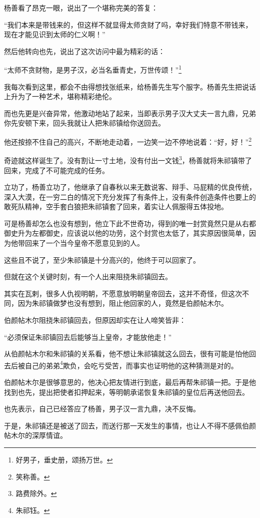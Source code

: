 \begin{multicols}{\theparacolNo}
杨善看了昂克一眼，说出了一个堪称完美的答复：

“我们本来是带钱来的，但这样不就显得太师贪财了吗，幸好我们特意不带钱来，现在才能见识到太师的仁义啊！”

然后他转向也先，说出了这次访问中最为精彩的话：

“太师不贪财物，是男子汉，必当名垂青史，万世传颂！”\footnote{好男子，垂史册，颂扬万世。}

我每次看到这里，都会不由得想找张纸来，给杨善先生写个服字。杨善先生把说话上升为了一种艺术，堪称精彩绝伦。

而也先更是兴奋异常，他激动地站了起来，当即表示男子汉大丈夫一言九鼎，兄弟你先安顿下来，回头我就让人把朱祁镇给你送回去。

他还按捺不住自己的高兴，不断地走动着，一边笑一边不停地说着：“好，好！”\footnote{笑称善。}

奇迹就这样诞生了。没有割让一寸土地，没有付出一文钱\footnote{路费除外。}，杨善就将朱祁镇带了回来，完成了不可能完成的任务。

立功了，杨善立功了，他继承了自春秋以来无数说客、辩手、马屁精的优良传统，深入大漠，在一穷二白的情况下充分发挥了有条件上，没有条件创造条件也要上的敢死队精神，空手套白狼把朱祁镇套了回来，着实让人佩服得五体投地。

可是杨善却怎么也没有想到，他立下此不世奇功，得到的唯一封赏竟然只是从右都御史升为左都御史，应该说以他的功劳，这个封赏也太低了，其实原因很简单，因为他带回来了一个当今皇帝不愿意见到的人。

这些且不说了，至少朱祁镇是十分高兴的，他终于可以回家了。

但就在这个关键时刻，有一个人出来阻挠朱祁镇回去。

其实在瓦剌，很多人仇视明朝，不愿意放明朝皇帝回去，这并不奇怪，但这次不同，因为朱祁镇做梦也没有想到，阻止他回家的人，竟然是伯颜帖木尔。

伯颜帖木尔阻挠朱祁镇回去，但原因却实在让人啼笑皆非：

“必须保证朱祁镇回去后能够当上皇帝，才能放他走！”

从伯颜帖木尔和朱祁镇的关系看，他不想让朱祁镇就这么回去，很有可能是怕他回去后被自己的弟弟\footnote{朱祁钰。}欺负，会吃亏受苦，而事实也证明他的这种猜测是对的。

伯颜帖木尔是很够意思的，他决心把友情进行到底，最后再帮朱祁镇一把。于是他找到也先，提出把使者扣押起来，等明朝承诺恢复朱祁镇的皇位后再送他回去。

也先表示，自己已经答应了杨善，男子汉一言九鼎，决不反悔。

于是，朱祁镇还是被送了回去，而送行那一天发生的事情，也让人不得不感佩伯颜帖木尔的深厚情谊。


\end{multicols}
